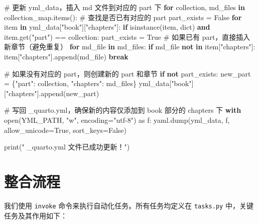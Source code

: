 \documentclass[
  letterpaper,
  DIV=11,
  numbers=noendperiod]{scrreprt}
\newenvironment{Shaded}{\begin{snugshade}}{\end{snugshade}}
\newcommand{\BuiltInTok}[1]{\textcolor[rgb]{0.00,0.23,0.31}{#1}}
\newcommand{\CommentTok}[1]{\textcolor[rgb]{0.37,0.37,0.37}{#1}}
\newcommand{\ControlFlowTok}[1]{\textcolor[rgb]{0.00,0.23,0.31}{\textbf{#1}}}
\newcommand{\ImportTok}[1]{\textcolor[rgb]{0.00,0.46,0.62}{#1}}
\newcommand{\KeywordTok}[1]{\textcolor[rgb]{0.00,0.23,0.31}{\textbf{#1}}}
\newcommand{\NormalTok}[1]{\textcolor[rgb]{0.00,0.23,0.31}{#1}}
\newcommand{\OperatorTok}[1]{\textcolor[rgb]{0.37,0.37,0.37}{#1}}
\newcommand{\StringTok}[1]{\textcolor[rgb]{0.13,0.47,0.30}{#1}}
\newcommand{\VariableTok}[1]{\textcolor[rgb]{0.07,0.07,0.07}{#1}}
\begin{document}
\begin{Shaded}
\begin{Highlighting}[]
\CommentTok{\# 更新 yml\_data，插入 md 文件到对应的 part 下}
\ControlFlowTok{for}\NormalTok{ collection, md\_files }\KeywordTok{in}\NormalTok{ collection\_map.items():}
    \CommentTok{\# 查找是否已有对应的 part}
\NormalTok{    part\_exists }\OperatorTok{=} \VariableTok{False}
    \ControlFlowTok{for}\NormalTok{ item }\KeywordTok{in}\NormalTok{ yml\_data[}\StringTok{"book"}\NormalTok{][}\StringTok{"chapters"}\NormalTok{]:}
        \ControlFlowTok{if} \BuiltInTok{isinstance}\NormalTok{(item, }\BuiltInTok{dict}\NormalTok{) }\KeywordTok{and}\NormalTok{ item.get(}\StringTok{"part"}\NormalTok{) }\OperatorTok{==}\NormalTok{ collection:}
\NormalTok{            part\_exists }\OperatorTok{=} \VariableTok{True}
            \CommentTok{\# 如果已有 part，直接插入新章节（避免重复）}
            \ControlFlowTok{for}\NormalTok{ md\_file }\KeywordTok{in}\NormalTok{ md\_files:}
                \ControlFlowTok{if}\NormalTok{ md\_file }\KeywordTok{not} \KeywordTok{in}\NormalTok{ item[}\StringTok{"chapters"}\NormalTok{]:}
\NormalTok{                    item[}\StringTok{"chapters"}\NormalTok{].append(md\_file)}
            \ControlFlowTok{break}

    \CommentTok{\# 如果没有对应的 part，则创建新的 part 和章节}
    \ControlFlowTok{if} \KeywordTok{not}\NormalTok{ part\_exists:}
\NormalTok{        new\_part }\OperatorTok{=}\NormalTok{ \{}\StringTok{"part"}\NormalTok{: collection, }\StringTok{"chapters"}\NormalTok{: md\_files\}}
\NormalTok{        yml\_data[}\StringTok{"book"}\NormalTok{][}\StringTok{"chapters"}\NormalTok{].append(new\_part)}

\CommentTok{\# 写回 \_quarto.yml，确保新的内容仅添加到 book 部分的 chapters 下}
\ControlFlowTok{with} \BuiltInTok{open}\NormalTok{(YML\_PATH, }\StringTok{"w"}\NormalTok{, encoding}\OperatorTok{=}\StringTok{"utf{-}8"}\NormalTok{) }\ImportTok{as}\NormalTok{ f:}
\NormalTok{    yaml.dump(yml\_data, f, allow\_unicode}\OperatorTok{=}\VariableTok{True}\NormalTok{, sort\_keys}\OperatorTok{=}\VariableTok{False}\NormalTok{)}

\BuiltInTok{print}\NormalTok{(}\StringTok{" \_quarto.yml 文件已成功更新！"}\NormalTok{)}
\end{Highlighting}
\end{Shaded}

\section{整合流程}\label{ux6574ux5408ux6d41ux7a0b}

我们使用 \texttt{invoke} 命令来执行自动化任务。所有任务均定义在
\texttt{tasks.py} 中，关键任务及其作用如下：
\end{document}
